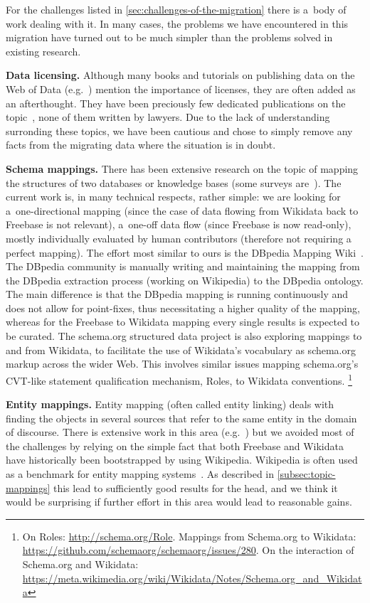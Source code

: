 \documentclass{acm_proc_article-sp}
\begin{document}
For the challenges listed in \autoref{sec:challenges-of-the-migration}
there is a~body of work dealing with it. In many cases, the problems we have encountered in
this migration have turned out to be much simpler than the problems solved in existing research.

\textbf{Data licensing.}
Although many books and tutorials on publishing data on the Web of Data
(e.g.~\cite{linkeddatabook,linkeddatabestpractises}) mention the importance of licenses,
they are often added as an afterthought.
They have been preciously few dedicated publications on the
topic~\cite{licenses,licensius}, none of them written by lawyers.
Due to the lack of understanding surronding these topics, we have been
cautious and chose to simply remove any facts from the migrating data
where the situation is in doubt.

\textbf{Schema mappings.}
There has been extensive research on the topic of mapping the structures
of two databases or knowledge bases
(some surveys are~\cite{mappingsurvey1,mappingsurvey2,mappingsurvey3}).
The current work is, in many technical respects, rather simple:
we are looking for a~one-directional mapping (since the case of data
flowing from Wikidata back to Freebase is not relevant),
a~one-off data flow (since Freebase is now read-only),
mostly individually evaluated by human contributors
(therefore not requiring a perfect mapping).
The effort most similar to ours is the DBpedia Mapping Wiki~\cite{lehmann2014dbpedia}.
The DBpedia community is manually writing and maintaining the mapping from
the DBpedia extraction process (working on Wikipedia) to the DBpedia ontology.
The main difference is that the DBpedia mapping is running continuously
and does not allow for point-fixes, thus necessitating a higher quality of the mapping,
whereas for the Freebase to Wikidata mapping every single results is expected to be curated.
The schema.org structured data project is also exploring mappings to and from Wikidata,
to facilitate the use of Wikidata's vocabulary as schema.org markup across the wider Web.
This involves similar issues mapping schema.org's CVT-like statement qualification mechanism, Roles,
to Wikidata conventions.%
\footnote{On Roles: \url{http://schema.org/Role}. Mappings from Schema.org to Wikidata:
\url{https://github.com/schemaorg/schemaorg/issues/280}. On the interaction of Schema.org
and Wikidata: \url{https://meta.wikimedia.org/wiki/Wikidata/Notes/Schema.org_and_Wikidata}}

\textbf{Entity mappings.}
Entity mapping (often called entity linking) deals with finding the objects
in several sources that refer to the same entity in the domain of discourse.
There is extensive work in this area (e.g.~\cite{entitylinkingsurvey1,entitylinkingsurvey2})
but we avoided most of the challenges by relying on the simple fact that
both Freebase and Wikidata have historically been bootstrapped by using Wikipedia.
Wikipedia is often used as a benchmark for entity mapping systems~\cite{entitylinkingwikipedia}.
As described in \autoref{subsec:topic-mappings} this lead to sufficiently good results for the head,
and we think it would be surprising if further effort in this area would lead to reasonable gains.
\end{document}
